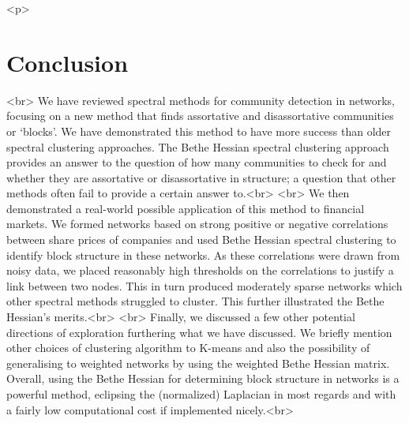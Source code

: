 <p>\section{Conclusion}<br>
We have reviewed spectral methods for community detection in networks, focusing on a new method that finds assortative and disassortative communities or ‘blocks’. We have demonstrated this method to have more success than older spectral clustering approaches. The Bethe Hessian spectral clustering approach provides an answer to the question of how many communities to check for and whether they are assortative or disassortative in structure; a question that other methods often fail to provide a certain answer to.<br>
\newline<br>
We then demonstrated a real-world possible application of this method to financial markets. We formed networks based on strong positive or negative correlations between share prices of companies and used Bethe Hessian spectral clustering to identify block structure in these networks. As these correlations were drawn from noisy data, we placed reasonably high thresholds on the correlations to justify a link between two nodes. This in turn produced moderately sparse networks which other spectral methods struggled to cluster. This further illustrated the Bethe Hessian’s merits.<br>
\newline<br>
Finally, we discussed a few other potential directions of exploration furthering what we have discussed. We briefly mention  other choices of clustering algorithm to K-means and also the possibility of generalising to weighted networks by using the weighted Bethe Hessian matrix. Overall, using the Bethe Hessian for determining block structure in networks is a  powerful method, eclipsing the (normalized) Laplacian in most regards and with a fairly low computational cost if implemented nicely.<br>
\showacknow{} %


